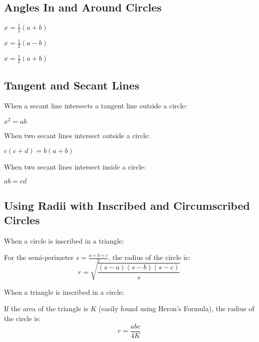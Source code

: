 \documentclass[final, letterpaper, 12pt]{article}
\begin{document}
	\subsection{Angles In and Around Circles}\label{sec: properties of arcs and angles of tangent and secant lines}
		
		
		 $x = \frac{1}{2}(a+b)$
		
		 $x = \frac{1}{2}(a-b)$
		
		 $x = \frac{1}{2}(a+b)$
		
	\subsection{Tangent and Secant Lines}\label{sec: properties of the lengths of tangent and secant lines}
	
		When a secant line intersects a tangent line outside a circle:
		
		 $x^2 = ab$
		
		When two secant lines intersect outside a circle:
		
		 $c(c+d) = b(a+b)$
		
		When two secant lines intersect inside a circle:
		
		 $ab = cd$
		
	\subsection{Using Radii with Inscribed and Circumscribed Circles}\label{sec: special formulae that involve triangles and circles}
	
		When a circle is inscribed in a triangle:
		
		
		
		For the semi-perimeter $s = \frac{a+b+c}{2}$, the radius of the circle is:
		\begin{equation}
			r = \sqrt{\frac{(s-a)(s-b)(s-c)}{s}}
		\end{equation}
		
		When a triangle is inscribed in a circle:
		
		
		
		If the area of the triangle is $K$ (easily found using Heron's Formula), the radius of the circle is:
		\begin{equation}
			r = \frac{abc}{4K}
		\end{equation}
	
\end{document}
